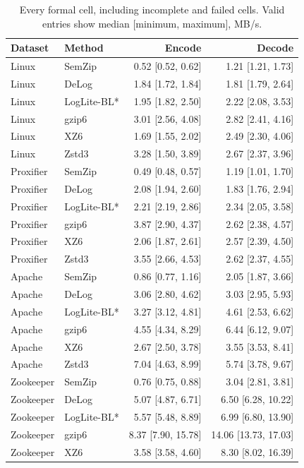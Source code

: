 \begin{longtable}{llrr}
\caption{Every formal cell, including incomplete and failed cells. Valid entries show median [minimum, maximum], MB/s.}\\
\toprule
Dataset & Method & Encode & Decode \\ \midrule\endhead
Linux & SemZip & 0.52 [0.52, 0.62] & 1.21 [1.21, 1.73] \\
Linux & DeLog & 1.84 [1.72, 1.84] & 1.81 [1.79, 2.64] \\
Linux & LogLite-BL* & 1.95 [1.82, 2.50] & 2.22 [2.08, 3.53] \\
Linux & gzip6 & 3.01 [2.56, 4.08] & 2.82 [2.41, 4.16] \\
Linux & XZ6 & 1.69 [1.55, 2.02] & 2.49 [2.30, 4.06] \\
Linux & Zstd3 & 3.28 [1.50, 3.89] & 2.67 [2.37, 3.96] \\
Proxifier & SemZip & 0.49 [0.48, 0.57] & 1.19 [1.01, 1.70] \\
Proxifier & DeLog & 2.08 [1.94, 2.60] & 1.83 [1.76, 2.94] \\
Proxifier & LogLite-BL* & 2.21 [2.19, 2.86] & 2.34 [2.05, 3.58] \\
Proxifier & gzip6 & 3.87 [2.90, 4.37] & 2.62 [2.38, 4.57] \\
Proxifier & XZ6 & 2.06 [1.87, 2.61] & 2.57 [2.39, 4.50] \\
Proxifier & Zstd3 & 3.55 [2.66, 4.53] & 2.62 [2.37, 4.55] \\
Apache & SemZip & 0.86 [0.77, 1.16] & 2.05 [1.87, 3.66] \\
Apache & DeLog & 3.06 [2.80, 4.62] & 3.03 [2.95, 5.93] \\
Apache & LogLite-BL* & 3.27 [3.12, 4.81] & 4.61 [2.53, 6.62] \\
Apache & gzip6 & 4.55 [4.34, 8.29] & 6.44 [6.12, 9.07] \\
Apache & XZ6 & 2.67 [2.50, 3.78] & 3.55 [3.53, 8.41] \\
Apache & Zstd3 & 7.04 [4.63, 8.99] & 5.74 [3.78, 9.67] \\
Zookeeper & SemZip & 0.76 [0.75, 0.88] & 3.04 [2.81, 3.81] \\
Zookeeper & DeLog & 5.07 [4.87, 6.71] & 6.50 [6.28, 10.22] \\
Zookeeper & LogLite-BL* & 5.57 [5.48, 8.89] & 6.99 [6.80, 13.90] \\
Zookeeper & gzip6 & 8.37 [7.90, 15.78] & 14.06 [13.73, 17.03] \\
Zookeeper & XZ6 & 3.58 [3.58, 4.60] & 8.30 [8.02, 16.39] \\

\end{longtable}
